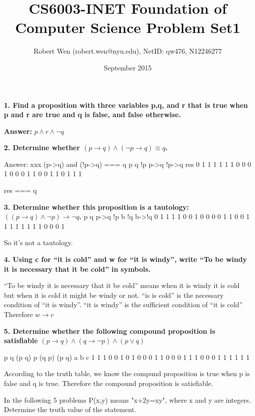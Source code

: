 \documentclass{article}
\title{CS6003-INET Foundation of Computer Science Problem Set1}
\author{Robert Wen (robert.wen@nyu.edu), NetID: qw476, N12246277}
\date{September 2015}
\begin{document}
\maketitle
\setlength{\parindent}{2ex}
\textbf{1. Find a proposition with three variables p,q, and r that is true when p and r are true and q is false, and false otherwise.}

\textbf{Answer:} $p \land r \land \lnot q$
\newline

\textbf{2. Determine whether $(p \to q) \land (\lnot p \to q) \equiv q$.}

Answer: xxx
(p->q) and (!p->q) === q
p  q  !p  p->q  !p->q   res
0  1  1   1     1       1
1  0  0   0     1       0
0  0  1   1     0       0
1  1  0   1     1       1

res === q

\newline

\textbf{3. Determine whether this proposition is a tautology: $((p \to q) \land \lnot p) \to \lnot q$.}
p  q  p->q  !p   b   !q   b->!q
0  1  1     1    1   0    0
1  0  0     0    0   1    1
0  0  1     1    1   1    1
1  1  1     0    0   0    1

So it's not a tautology.

\textbf{4. Using c for ``it is cold'' and w for ``it is windy'', write ``To be windy it is necessary that it be cold'' in symbols.}

``To be windy it is necessary that it be cold'' means when it is windy it is cold but when it is cold it might be windy or not. ``is is cold'' is the necessary condition of ``it is windy''. ``it is windy'' is the sufficient condition of ``it is cold''
Therefore $w \to c$

\textbf{5. Determine whether the following compound proposition is satisfiable $(p \to q) \land (q \to \lnot p)\land (p \lor q)$}

p  q  (p \to q)  \lnot p  (q \to \lnot p)  (p \lor q)  a \land b \land c
1  1  1          0         0                1          0
1  0  0          0         1                1          0
0  0  1          1         1                0          0
0  1  1          1         1                1          1

According to the truth table, we know the compund proposition is true when p is false and q is true.
Therefore the compound proposition is satisfiable.

In the following 5 problems P(x,y) means "x+2y=xy", where x and y are integers. Determine the truth value of the statement.
\end{document}

